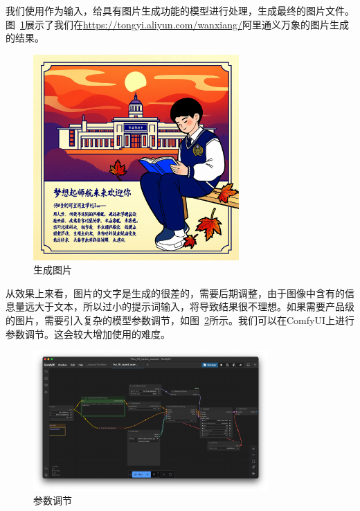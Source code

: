 \documentclass{article}
\begin{document}
我们使用作为输入，给具有图片生成功能的模型进行处理，生成最终的图片文件。图~\ref{fig:generate_image}展示了我们在\url{https://tongyi.aliyun.com/wanxiang/}阿里通义万象的图片生成的结果。

\begin{figure}[htbp]
  \centering
  \includegraphics[width=0.7\textwidth]{./fig/image.png}
  \caption{生成图片}
  \label{fig:generate_image}
\end{figure}

从效果上来看，图片的文字是生成的很差的，需要后期调整，由于图像中含有的信息量远大于文本，所以过小的提示词输入，将导致结果很不理想。如果需要产品级的图片，需要引入复杂的模型参数调节，如图~\ref{fig:set_param}所示。我们可以在ComfyUI上进行参数调节。这会较大增加使用的难度。

\begin{figure}[htbp]
  \centering
  \includegraphics[width=0.8\textwidth]{./fig/set_param.png}
  \caption{参数调节}
  \label{fig:set_param}
\end{figure}
\end{document}
